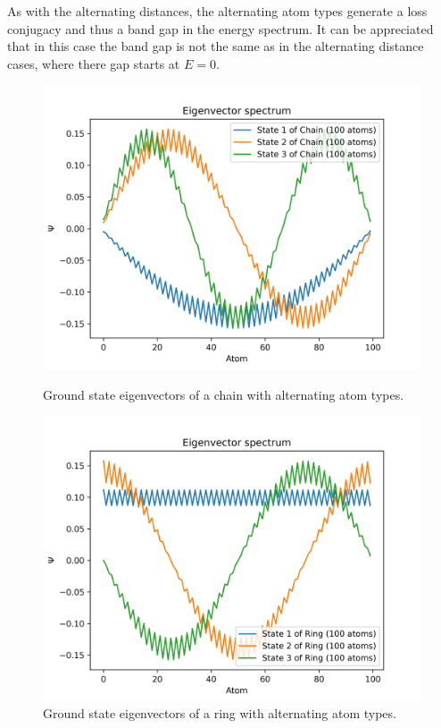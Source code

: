 \documentclass{article}
\begin{document}
As with the alternating distances, the alternating atom types generate a loss conjugacy and thus a band gap in the energy spectrum. It can be appreciated that in this case the band gap is not the same as in the alternating distance cases, where there gap starts at $E = 0$. 


\begin{figure}[h]
    \centering
    \begin{minipage}{0.47\textwidth}
        \centering
        \includegraphics[width=\textwidth]{Figures/chain_alpha_eigenvectors.jpg}
        \caption{Ground state eigenvectors of a chain with alternating atom types.}
        \label{fig:chain_alternating_alpha_vec}
    \end{minipage}
    \hfill
    \begin{minipage}{0.47\textwidth}
        \centering
        \includegraphics[width=\textwidth]{Figures/ring_alpha_eigenvectors.jpg}
        \caption{Ground state eigenvectors of a ring with alternating atom types.}
        \label{fig:ring_alternating_alpha_vec}
    \end{minipage}
\end{figure}

\end{document}
